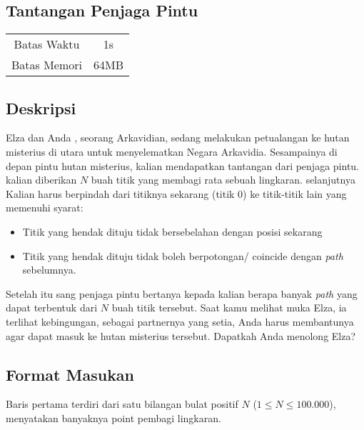 \documentclass{article}
\begin{document}
\begin{center}
    \section*{Tantangan Penjaga Pintu} %

    \begin{tabular}{ | c c | }
        \hline
        Batas Waktu  & 1s \\    %
        Batas Memori & 64MB \\  %
        \hline
    \end{tabular}
\end{center}

\subsection*{Deskripsi}

Elza dan Anda , seorang Arkavidian, sedang melakukan petualangan ke hutan misterius di utara untuk menyelematkan Negara Arkavidia.
Sesampainya di depan pintu hutan misterius, kalian mendapatkan tantangan dari penjaga pintu.
kalian diberikan $N$ buah titik yang membagi rata sebuah lingkaran. selanjutnya Kalian harus berpindah dari titiknya
sekarang (titik 0) ke titik-titik lain yang memenuhi syarat:

\begin{itemize}
    \setlength\itemsep{0pt}
    \item Titik yang hendak dituju tidak bersebelahan dengan posisi sekarang
    \item Titik yang hendak dituju tidak boleh berpotongan/ coincide dengan \textit{path} sebelumnya.
\end{itemize}

Setelah itu sang penjaga pintu bertanya kepada kalian berapa banyak \textit{path} yang dapat terbentuk dari $N$ buah titik tersebut.
Saat kamu melihat muka Elza, ia terlihat kebingungan, sebagai partnernya yang setia, Anda harus membantunya 
agar dapat masuk ke hutan misterius tersebut. Dapatkah Anda menolong Elza?

\subsection*{Format Masukan}
Baris pertama terdiri dari satu bilangan bulat positif $N$ ($1 \leq N \leq 100.000$), menyatakan banyaknya point pembagi lingkaran.
\end{document}
